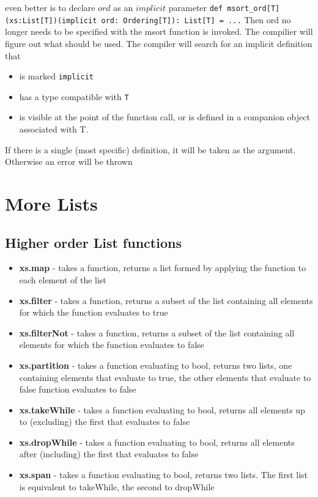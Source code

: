 even better is to declare $ord$ as an $implicit$ parameter
\lstinline|def msort_ord[T](xs:List[T])(implicit ord: Ordering[T]): List[T] = ...|
Then ord no longer needs to be specified with the msort function is invoked. The compilier will figure out what should be used.
The compiler will search for an implicit definition that
\begin{itemize}
  \item is marked \lstinline|implicit|
  \item has a type compatible with \lstinline|T|
  \item is visible at the point of the function call, or is defined in a companion object associated with T.
\end{itemize}
If there is a single (most specific) definition, it will be taken as the argument. Otherwise an error will be thrown

\section{More Lists}
\subsection{Higher order List functions}
\begin{itemize}
  \item \textbf{xs.map} - takes a function, returns a list formed by applying the function to each element of the list
  \item \textbf{xs.filter} - takes a function, returns a subset of the list containing all elements for which the function evaluates to true
  \item \textbf{xs.filterNot} - takes a function, returns a subset of the list containing all elements for which the function evaluates to false
  \item \textbf{xs.partition} - takes a function evaluating to bool, returns two lists, one containing elements that evaluate to true, the other elements that evaluate to false
  function evaluates to false
  \item \textbf{xs.takeWhile} - takes a function evaluating to bool, returns all elements up to (excluding) the first that evaluates to false
  \item \textbf{xs.dropWhile} - takes a function evaluating to bool, returns all elements after (including) the first that evaluates to false
  \item \textbf{xs.span} - takes a function evaluating to bool, returns two lists. The first list is equivalent to takeWhile, the second to dropWhile
\end{itemize}

